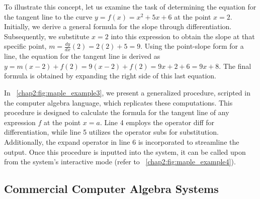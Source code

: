 To illustrate this concept, let us examine the task of determining the equation for the tangent line to the curve $y = f(x) = x^2 + 5x + 6$ at the point $x = 2$. Initially, we derive a general formula for the slope through differentiation. Subsequently, we substitute $x = 2$ into this expression to obtain the slope at that specific point, $m = \frac{dy}{dx}(2) = 2(2) + 5 = 9$. Using the point-slope form for a line, the equation for the tangent line is derived as $y = m(x - 2) + f(2) = 9(x - 2) + f(2) = 9x + 2 + 6 = 9x + 8$. The final formula is obtained by expanding the right side of this last equation.

In \figurename~\ref{chap2:fig:maple_example3}, we present a generalized procedure, scripted in the \Maple{} computer algebra language, which replicates these computations. This procedure is designed to calculate the formula for the tangent line of any expression $f$ at the point $x = a$. Line 4 employs the operator diff for differentiation, while line 5 utilizes the operator subs for substitution. Additionally, the expand operator in line 6 is incorporated to streamline the output. Once this procedure is inputted into the \Maple{} system, it can be called upon from the system's interactive mode (refer to \figurename~\ref{chap2:fig:maple_example4}).

\subsection{Commercial Computer Algebra Systems}

